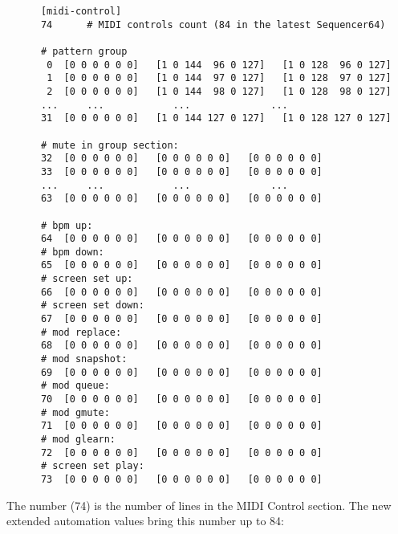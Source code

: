    \begin{verbatim}
      [midi-control]
      74      # MIDI controls count (84 in the latest Sequencer64)

      # pattern group
       0  [0 0 0 0 0 0]   [1 0 144  96 0 127]   [1 0 128  96 0 127]            
       1  [0 0 0 0 0 0]   [1 0 144  97 0 127]   [1 0 128  97 0 127]            
       2  [0 0 0 0 0 0]   [1 0 144  98 0 127]   [1 0 128  98 0 127]            
      ...     ...            ...              ...
      31  [0 0 0 0 0 0]   [1 0 144 127 0 127]   [1 0 128 127 0 127]            

      # mute in group section:
      32  [0 0 0 0 0 0]   [0 0 0 0 0 0]   [0 0 0 0 0 0]   
      33  [0 0 0 0 0 0]   [0 0 0 0 0 0]   [0 0 0 0 0 0]   
      ...     ...            ...              ...
      63  [0 0 0 0 0 0]   [0 0 0 0 0 0]   [0 0 0 0 0 0]   

      # bpm up:
      64  [0 0 0 0 0 0]   [0 0 0 0 0 0]   [0 0 0 0 0 0]   
      # bpm down:
      65  [0 0 0 0 0 0]   [0 0 0 0 0 0]   [0 0 0 0 0 0]   
      # screen set up:
      66  [0 0 0 0 0 0]   [0 0 0 0 0 0]   [0 0 0 0 0 0]   
      # screen set down:
      67  [0 0 0 0 0 0]   [0 0 0 0 0 0]   [0 0 0 0 0 0]   
      # mod replace:
      68  [0 0 0 0 0 0]   [0 0 0 0 0 0]   [0 0 0 0 0 0]   
      # mod snapshot:
      69  [0 0 0 0 0 0]   [0 0 0 0 0 0]   [0 0 0 0 0 0]   
      # mod queue:
      70  [0 0 0 0 0 0]   [0 0 0 0 0 0]   [0 0 0 0 0 0]   
      # mod gmute:
      71  [0 0 0 0 0 0]   [0 0 0 0 0 0]   [0 0 0 0 0 0]   
      # mod glearn:
      72  [0 0 0 0 0 0]   [0 0 0 0 0 0]   [0 0 0 0 0 0]   
      # screen set play:
      73  [0 0 0 0 0 0]   [0 0 0 0 0 0]   [0 0 0 0 0 0]   
   \end{verbatim}

   The number (74) is the number of lines in the MIDI Control section.
   The new extended automation values bring this number up to 84:

